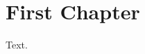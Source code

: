 \documentclass[nodeprecatedcode]{dndbook}
\begin{document}
\tableofcontents
\chapter{First Chapter}
Text.
\appendix

\end{document}
